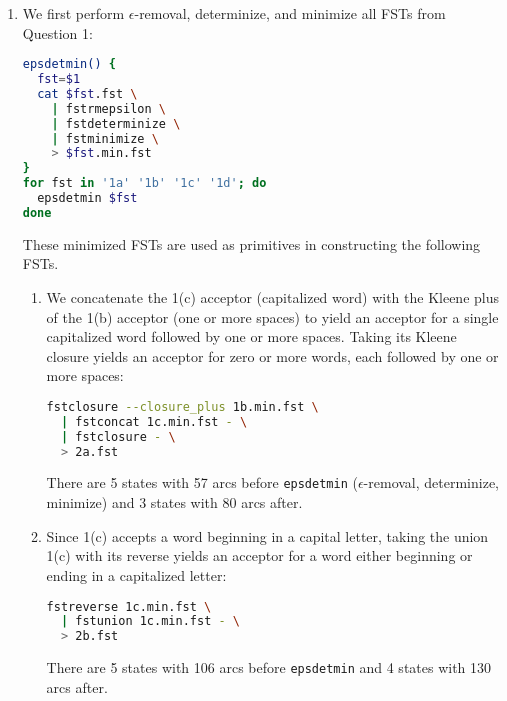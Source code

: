 \documentclass[a4paper,oneside,reqno]{amsart}
\begin{document}
\begin{enumerate}[label=\arabic*.]
\begin{enumerate}[label=(\alph*)]
        \texttt{a\_fst} accepts the single character ``a'':
        \begin{lstlisting}[language=bash]
a_fst=$(echo '0 1 a a\n1' \
  | fstcompile --isymbols=$SYMBOLS --osymbols=$SYMBOLS -)
        \end{lstlisting}

        Concatenating $\texttt{word\_fst} + \texttt{a\_fst} + \texttt{word\_fst}$
        yields an FST accepting a word containing the letter ``a''
        \begin{lstlisting}[language=bash]
fstconcat <(echo $a_fst) <(echo $word_fst) \
  | fstconcat <(echo $word_fst) - \
  > 1d.fst
        \end{lstlisting}

    \end{enumerate}

  \item We first perform $\epsilon$-removal, determinize, and minimize all FSTs
    from Question 1:
    \begin{lstlisting}[language=bash]
epsdetmin() {
  fst=$1
  cat $fst.fst \
    | fstrmepsilon \
    | fstdeterminize \
    | fstminimize \
    > $fst.min.fst
}
for fst in '1a' '1b' '1c' '1d'; do
  epsdetmin $fst
done
    \end{lstlisting}
    These minimized FSTs are used as primitives in constructing the following FSTs.

    \begin{enumerate}[label=(\alph*)]
      \item
        We concatenate the 1(c) acceptor (capitalized word) with the Kleene
        plus of the 1(b) acceptor (one or more spaces) to yield an acceptor for
        a single capitalized word followed by one or more spaces. Taking its
        Kleene closure yields an acceptor for zero or more words, each followed
        by one or more spaces:
        \begin{lstlisting}[language=bash]
fstclosure --closure_plus 1b.min.fst \
  | fstconcat 1c.min.fst - \
  | fstclosure - \
  > 2a.fst
        \end{lstlisting}
        There are 5 states with 57 arcs before \texttt{epsdetmin} ($\epsilon$-removal,
        determinize, minimize) and 3 states with 80 arcs after.

      \item Since 1(c) accepts a word beginning in a capital letter, taking the union
        1(c) with its reverse yields an acceptor for a word either beginning or
        ending in a capitalized letter:
        \begin{lstlisting}[language=bash]
fstreverse 1c.min.fst \
  | fstunion 1c.min.fst - \
  > 2b.fst
        \end{lstlisting}
        There are 5 states with 106 arcs before \texttt{epsdetmin} and 4
        states with 130 arcs after.


\end{enumerate}
\end{enumerate}
\end{document}
